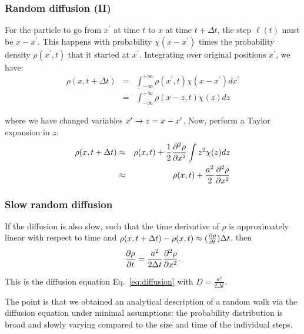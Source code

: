 \documentclass[hyperref={colorlinks=true}]{beamer}
\begin{document}
\begin{frame}%
  \frametitle{Random diffusion (II)}
  
  For the particle to go from $x^{\prime}$ at time $t$ to $x$ at time $t+\Delta t$, the step $\ell(t)$ must be $x - x^{\prime}$. This happens with probability $\chi(x - x^{\prime})$ times the probability density $\rho(x^{\prime} , t)$ that it started at $x^{\prime}$. Integrating over original positions $x^{\prime}$, we have:
  \begin{eqnarray}
    \rho(x, t + \Delta t) &=& \int_{-\infty}^{+\infty} \rho(x^{\prime}, t) \chi(x - x^{\prime}) dx^{\prime} \\
                          &=& \int_{-\infty}^{+\infty} \rho(x - z, t) \chi(z) dz
  \end{eqnarray}

  where we have changed variables $x^{\prime} \rightarrow z = x - x^{\prime}$. Now, perform a Taylor expansion in $z$:
  \begin{eqnarray}
    \rho(x, t + \Delta t) &\approx& \rho(x,t) + \frac{1}{2} \frac{\partial^2 \rho}{\partial x^2} \int z^2 \chi(z) dz \\
                          &\approx& \rho(x,t) + \frac{a^2}{2} \frac{\partial^2 \rho}{\partial x^2}
  \end{eqnarray}

\end{frame}


\begin{frame}%
  \frametitle{Slow random diffusion}
  
  If the diffusion is also slow, such that the time derivative of $\rho$ is approximately linear with respect to time and $\rho(x, t + \Delta t) - \rho(x, t) \approx (\frac{\partial \rho}{\partial t}) \Delta t$, then
  \begin{eqnarray}
    \frac{\partial \rho}{\partial t} = \frac{a^2}{2 \Delta t} \frac{\partial^2 \rho}{\partial x^2}.
  \end{eqnarray}

  This is the diffusion equation Eq.~\ref{eq:diffusion} with $D=\frac{a^2}{2 \Delta t}$.
  
  \vspace{0.3cm}
  
  The point is that we obtained an analytical description of a random walk via the diffusion equation under minimal assumptions: the probability distribution is broad and slowly varying compared to the size and time of the individual steps.

\end{frame}
\end{document}
